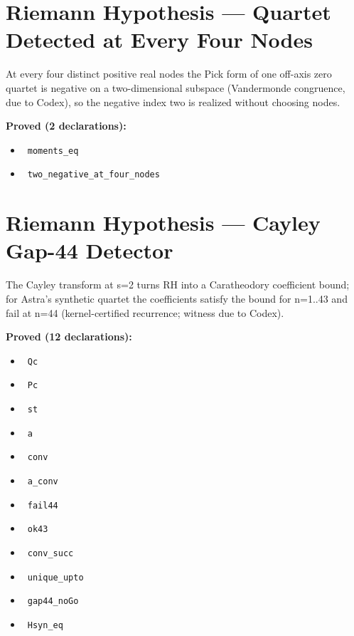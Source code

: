 \documentclass{report}
\theoremstyle{definition}
\begin{document}
\section{Riemann Hypothesis --- Quartet Detected at Every Four Nodes}
At every four distinct positive real nodes the Pick form of one off-axis zero quartet is negative on a two-dimensional subspace (Vandermonde congruence, due to Codex), so the negative index two is realized without choosing nodes.

\noindent\textbf{Proved (2 declarations):}
\begin{itemize}
  \item {}\leanok\ \texttt{moments\_eq}
  \item {}\leanok\ \texttt{two\_negative\_at\_four\_nodes}
\end{itemize}

\section{Riemann Hypothesis --- Cayley Gap-44 Detector}
The Cayley transform at s=2 turns RH into a Caratheodory coefficient bound; for Astra's synthetic quartet the coefficients satisfy the bound for n=1..43 and fail at n=44 (kernel-certified recurrence; witness due to Codex).

\noindent\textbf{Proved (12 declarations):}
\begin{itemize}
  \item {}\leanok\ \texttt{Qc}
  \item {}\leanok\ \texttt{Pc}
  \item {}\leanok\ \texttt{st}
  \item {}\leanok\ \texttt{a}
  \item {}\leanok\ \texttt{conv}
  \item {}\leanok\ \texttt{a\_conv}
  \item {}\leanok\ \texttt{fail44}
  \item {}\leanok\ \texttt{ok43}
  \item {}\leanok\ \texttt{conv\_succ}
  \item {}\leanok\ \texttt{unique\_upto}
  \item {}\leanok\ \texttt{gap44\_noGo}
  \item {}\leanok\ \texttt{Hsyn\_eq}
\end{itemize}
\end{document}
